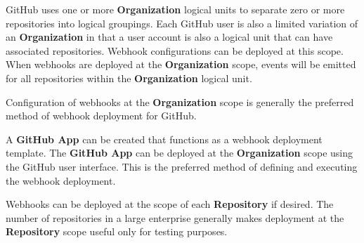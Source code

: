 GitHub uses one or more \textbf{Organization} logical units to separate zero or more
repositories into logical groupings. Each GitHub user is also a limited variation of an
\textbf{Organization} in that a user account is also a logical unit that can have
associated repositories.  Webhook configurations can be deployed at this scope.
When webhooks are deployed at the \textbf{Organization} scope, events
will be emitted for all repositories within the \textbf{Organization} logical unit.

Configuration of webhooks at the \textbf{Organization} scope is generally the preferred
method of webhook deployment for GitHub.

A \textbf{GitHub App} can be created that functions as a webhook deployment template.
The \textbf{GitHub App} can be deployed at the \textbf{Organization} scope using the
GitHub user interface.  This is the preferred method of defining and executing the webhook deployment.

Webhooks can be deployed at the scope of each \textbf{Repository} if desired.  The number of repositories
in a large enterprise generally makes deployment at the \textbf{Repository} scope useful
only for testing purposes.  
